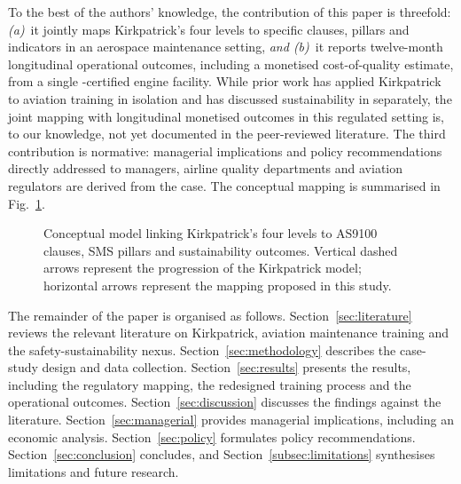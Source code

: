 To the best of the authors' knowledge, the contribution of this paper is
threefold: \emph{(a)}~it jointly maps Kirkpatrick's four levels to specific
\AS{} clauses, \SMS{} pillars and \ESG{} indicators in an aerospace
maintenance setting, \emph{and (b)}~it reports twelve-month longitudinal
operational outcomes, including a monetised cost-of-quality estimate, from a
single \AS{}-certified engine \MRO{} facility. While prior work has applied
Kirkpatrick to aviation training in isolation and has discussed sustainability
in \MRO{} separately, the joint mapping with longitudinal monetised outcomes
in this regulated setting is, to our knowledge, not yet documented in the
peer-reviewed literature. The third contribution is normative: managerial
implications and policy recommendations directly addressed to \MRO{} managers,
airline quality departments and aviation regulators are derived from the
case. The conceptual mapping is summarised in Fig.~\ref{fig:conceptual}.

\begin{figure}[!tbp]
  \centering
  \resizebox{0.95\textwidth}{!}{}
  \caption{Conceptual model linking Kirkpatrick's four levels to AS9100
           clauses, SMS pillars and sustainability outcomes. Vertical dashed
           arrows represent the progression of the Kirkpatrick model;
           horizontal arrows represent the mapping proposed in this study.}
  \label{fig:conceptual}
\end{figure}

The remainder of the paper is organised as follows.
Section~\ref{sec:literature} reviews the relevant literature on Kirkpatrick,
aviation maintenance training and the safety-sustainability nexus.
Section~\ref{sec:methodology} describes the case-study design and data
collection. Section~\ref{sec:results} presents the results, including the
regulatory mapping, the redesigned training process and the operational
outcomes. Section~\ref{sec:discussion} discusses the findings against the
literature. Section~\ref{sec:managerial} provides managerial implications,
including an economic analysis. Section~\ref{sec:policy} formulates policy
recommendations. Section~\ref{sec:conclusion} concludes, and
Section~\ref{subsec:limitations} synthesises limitations and future research.

